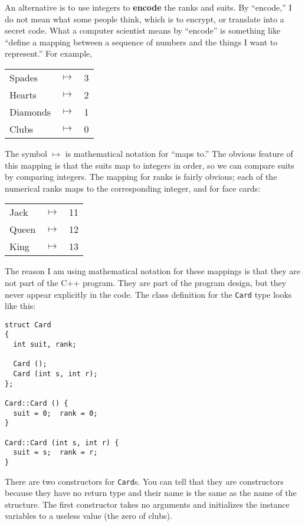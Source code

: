 
An alternative is to use integers to {\bf encode} the ranks and
suits.  By ``encode,'' I do not mean what some people think, which
is to encrypt, or translate into a secret code.  What a computer
scientist means by ``encode'' is something like ``define a mapping
between a sequence of numbers and the things I want to represent.''
For example,

\vspace{0.1in}
\begin{tabular}{l c l}
Spades & $\mapsto$ & 3 \\
Hearts & $\mapsto$ & 2 \\
Diamonds & $\mapsto$ & 1 \\
Clubs & $\mapsto$ & 0
\end{tabular}
\vspace{0.1in}

The symbol $\mapsto$ is mathematical notation for ``maps to.''
The obvious feature of this mapping is that the suits map to
integers in order, so we can compare suits by comparing integers.
The mapping for ranks is fairly obvious; each of the numerical
ranks maps to the corresponding integer, and for face cards:

\vspace{0.1in}
\begin{tabular}{l c l}
Jack & $\mapsto$ & 11 \\
Queen & $\mapsto$ & 12 \\
King & $\mapsto$ & 13 \\
\end{tabular}
\vspace{0.1in}

The reason I am using mathematical notation for these mappings is
that they are not part of the C++ program.  They are part of the
program design, but they never appear explicitly in the code.
The class definition for the {\tt Card} type looks like this:

\begin{verbatim}
struct Card
{
  int suit, rank;

  Card ();
  Card (int s, int r);
};

Card::Card () { 
  suit = 0;  rank = 0;
}

Card::Card (int s, int r) { 
  suit = s;  rank = r;
}
\end{verbatim}
%
There are two constructors for {\tt Card}s.  You can tell that
they are constructors because they have no return type and their
name is the same as the name of the structure.  The first
constructor takes no arguments and initializes the instance
variables to a useless value (the zero of clubs).

